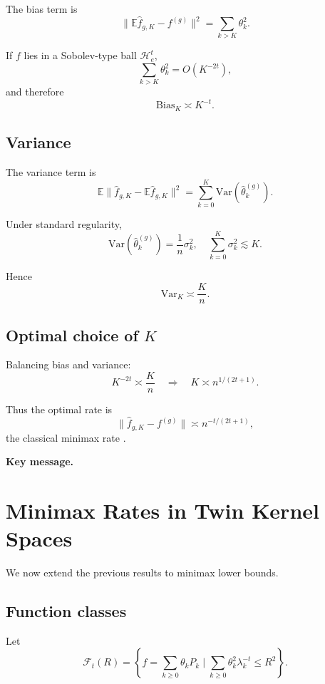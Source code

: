 \documentclass[11pt,a4paper]{article}
\newcommand{\E}{\mathbb{E}}
\newcommand{\Var}{\mathrm{Var}}
\newcommand{\RKHS}{\mathcal{H}}
\begin{document}
The bias term is
\[
\|\E \hat{f}_{g,K} - f^{(g)}\|^2 = \sum_{k > K} \theta_k^2.
\]

If $f$ lies in a Sobolev-type ball $\RKHS_e^t$,
\[
\sum_{k > K} \theta_k^2 = O(K^{-2t}),
\]
and therefore
\[
\mathrm{Bias}_K \asymp K^{-t}.
\]

\subsection{Variance}

The variance term is
\[
\E \|\hat{f}_{g,K} - \E \hat{f}_{g,K}\|^2 = \sum_{k=0}^{K} \Var(\hat{\theta}_k^{(g)}).
\]

Under standard regularity,
\[
\Var(\hat{\theta}_k^{(g)}) = \frac{1}{n} \sigma_k^2, \quad \sum_{k=0}^{K} \sigma_k^2 \lesssim K.
\]

Hence
\[
\mathrm{Var}_K \asymp \frac{K}{n}.
\]

\subsection{Optimal choice of $K$}

Balancing bias and variance:
\[
K^{-2t} \asymp \frac{K}{n} \quad \Rightarrow \quad K \asymp n^{1/(2t+1)}.
\]

Thus the optimal rate is
\[
\|\hat{f}_{g,K} - f^{(g)}\| \asymp n^{-t/(2t+1)},
\]
the classical minimax rate \citep{Stone1982,Tsybakov2009}.

\textbf{Key message.}
\begin{center}
\end{center}

\section{Minimax Rates in Twin Kernel Spaces}\label{sec:minimax}

We now extend the previous results to minimax lower bounds.

\subsection{Function classes}

Let
\[
\mathcal{F}_t(R) = \left\{ f = \sum_{k \geq 0} \theta_k P_k \;\Big|\; \sum_{k \geq 0} \theta_k^2 \lambda_k^{-t} \leq R^2 \right\}.
\]
\end{document}

